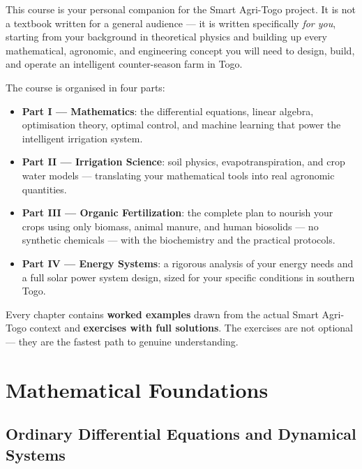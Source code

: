 \documentclass[12pt,a4paper,openany]{book}
\begin{document}
This course is your personal companion for the Smart Agri-Togo project. It is not a textbook written for a general audience — it is written specifically \textit{for you}, starting from your background in theoretical physics and building up every mathematical, agronomic, and engineering concept you will need to design, build, and operate an intelligent counter-season farm in Togo.

The course is organised in four parts:
\begin{itemize}[leftmargin=2em]
  \item \textbf{Part I — Mathematics}: the differential equations, linear algebra, optimisation theory, optimal control, and machine learning that power the intelligent irrigation system.
  \item \textbf{Part II — Irrigation Science}: soil physics, evapotranspiration, and crop water models — translating your mathematical tools into real agronomic quantities.
  \item \textbf{Part III — Organic Fertilization}: the complete plan to nourish your crops using only biomass, animal manure, and human biosolids — no synthetic chemicals — with the biochemistry and the practical protocols.
  \item \textbf{Part IV — Energy Systems}: a rigorous analysis of your energy needs and a full solar power system design, sized for your specific conditions in southern Togo.
\end{itemize}

Every chapter contains \textbf{worked examples} drawn from the actual Smart Agri-Togo context and \textbf{exercises with full solutions}. The exercises are not optional — they are the fastest path to genuine understanding.

\tableofcontents
\newpage

\part{Mathematical Foundations}

\chapter{Ordinary Differential Equations and Dynamical Systems}
\label{chap:ode}
\end{document}
